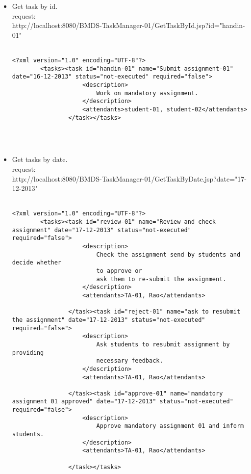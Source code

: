 \begin{itemize}
		\item
		Get task by id.\\	
		request:\\	
		http://localhost:8080/BMDS-TaskManager-01/GetTaskById.jsp?id="handin-01"\\\\
		
		\begin{lstlisting}[caption=response:]
		<?xml version="1.0" encoding="UTF-8"?>
		<tasks><task id="handin-01" name="Submit assignment-01" date="16-12-2013" status="not-executed" required="false">
					<description>
						Work on mandatory assignment.
					</description>
					<attendants>student-01, student-02</attendants>
				</task></tasks>
		\end{lstlisting}
		\\\\
		
		\item
		Get tasks by date.\\
		request:\\
		http://localhost:8080/BMDS-TaskManager-01/GetTaskByDate.jsp?date="17-12-2013"\\\\
		
		\begin{lstlisting}[caption=response:]
		<?xml version="1.0" encoding="UTF-8"?>
		<tasks><task id="review-01" name="Review and check assignment" date="17-12-2013" status="not-executed" required="false">
					<description>
						Check the assignment send by students and decide whether
						to approve or
						ask them to re-submit the assignment.
					</description>
					<attendants>TA-01, Rao</attendants>
		
				</task><task id="reject-01" name="ask to resubmit the assignment" date="17-12-2013" status="not-executed" required="false">
					<description>
						Ask students to resubmit assignment by providing
						necessary feedback.
					</description>
					<attendants>TA-01, Rao</attendants>
		
				</task><task id="approve-01" name="mandatory assignment 01 approved" date="17-12-2013" status="not-executed" required="false">
					<description>
						Approve mandatory assignment 01 and inform students.
					</description>
					<attendants>TA-01, Rao</attendants>
		
				</task></tasks>
		\end{lstlisting}
		\end{itemize}
